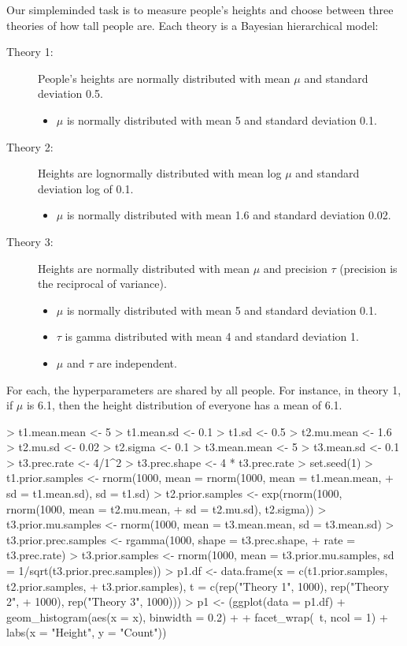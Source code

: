 \documentclass[letterpaper,12pt]{article}
\begin{document}
Our simpleminded task is to measure people's heights and choose
between three theories of how tall people are.  Each theory is a
Bayesian hierarchical model:

\begin{description}
  \item[Theory 1:] People's heights are normally distributed with
    mean $\mu$ and standard deviation 0.5.
    \begin{itemize}
      \item $\mu$ is normally distributed with mean 5 and standard
        deviation 0.1.
    \end{itemize}
  \item[Theory 2:] Heights are lognormally distributed with mean log
    $\mu$ and standard deviation log of 0.1.
    \begin{itemize}
    \item $\mu$ is normally distributed with mean 1.6 and standard
      deviation 0.02.
    \end{itemize}
  \item[Theory 3:] Heights are normally distributed with mean $\mu$
    and precision $\tau$ (precision is the reciprocal of variance).
    \begin{itemize}
    \item $\mu$ is normally distributed with mean 5 and standard
      deviation 0.1.
    \item $\tau$ is gamma distributed with mean 4 and standard
      deviation 1.
    \item $\mu$ and $\tau$ are independent.
    \end{itemize}
\end{description}

\noindent For each, the hyperparameters are shared by all people.  For
instance, in theory 1, if $\mu$ is 6.1, then the height distribution
of everyone has a mean of 6.1.

\begin{Schunk}
\begin{Sinput}
> t1.mean.mean <- 5
> t1.mean.sd <- 0.1
> t1.sd <- 0.5
> t2.mu.mean <- 1.6
> t2.mu.sd <- 0.02
> t2.sigma <- 0.1
> t3.mean.mean <- 5
> t3.mean.sd <- 0.1
> t3.prec.rate <- 4/1^2
> t3.prec.shape <- 4 * t3.prec.rate
> set.seed(1)
> t1.prior.samples <- rnorm(1000, mean = rnorm(1000, mean = t1.mean.mean, 
+     sd = t1.mean.sd), sd = t1.sd)
> t2.prior.samples <- exp(rnorm(1000, rnorm(1000, mean = t2.mu.mean, 
+     sd = t2.mu.sd), t2.sigma))
> t3.prior.mu.samples <- rnorm(1000, mean = t3.mean.mean, sd = t3.mean.sd)
> t3.prior.prec.samples <- rgamma(1000, shape = t3.prec.shape, 
+     rate = t3.prec.rate)
> t3.prior.samples <- rnorm(1000, mean = t3.prior.mu.samples, sd = 1/sqrt(t3.prior.prec.samples))
> p1.df <- data.frame(x = c(t1.prior.samples, t2.prior.samples, 
+     t3.prior.samples), t = c(rep("Theory 1", 1000), rep("Theory 2", 
+     1000), rep("Theory 3", 1000)))
> p1 <- (ggplot(data = p1.df) + geom_histogram(aes(x = x), binwidth = 0.2) + 
+     facet_wrap(~t, ncol = 1) + labs(x = "Height", y = "Count"))
\end{Sinput}
\end{Schunk}
\end{document}
